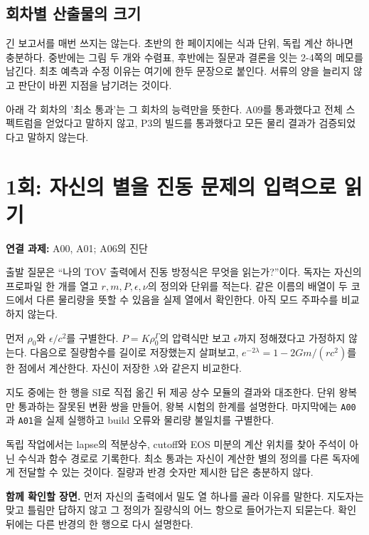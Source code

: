 \documentclass[
  10pt,
  a4paper,
]{article}
\begin{document}
\subsection{회차별 산출물의
크기}\label{uxd68cuxcc28uxbcc4-uxc0b0uxcd9cuxbb3cuxc758-uxd06cuxae30}

긴 보고서를 매번 쓰지는 않는다. 초반의 한 페이지에는 식과 단위, 독립
계산 하나면 충분하다. 중반에는 그림 두 개와 수렴표, 후반에는 질문과
결론을 잇는 2-4쪽의 메모를 남긴다. 최초 예측과 수정 이유는 여기에 한두
문장으로 붙인다. 서류의 양을 늘리지 않고 판단이 바뀐 지점을 남기려는
것이다.

아래 각 회차의 '최소 통과'는 그 회차의 능력만을 뜻한다. A09를 통과했다고
전체 스펙트럼을 얻었다고 말하지 않고, P3의 빌드를 통과했다고 모든 물리
결과가 검증되었다고 말하지 않는다.

\section{1회: 자신의 별을 진동 문제의 입력으로
읽기}\label{uxd68c-uxc790uxc2e0uxc758-uxbcc4uxc744-uxc9c4uxb3d9-uxbb38uxc81cuxc758-uxc785uxb825uxc73cuxb85c-uxc77duxae30}

\textbf{연결 과제:} A00, A01; A06의 진단

출발 질문은 ``나의 TOV 출력에서 진동 방정식은 무엇을 읽는가?''이다.
독자는 자신의 프로파일 한 개를 열고 \(r,m,P,\epsilon,\nu\)의 정의와
단위를 적는다. 같은 이름의 배열이 두 코드에서 다른 물리량을 뜻할 수
있음을 실제 열에서 확인한다. 아직 모드 주파수를 비교하지 않는다.

먼저 \(\rho_0\)와 \(\epsilon/c^2\)를 구별한다. \(P=K\rho_0^\Gamma\)의
압력식만 보고 \(\epsilon\)까지 정해졌다고 가정하지 않는다. 다음으로
질량함수를 길이로 저장했는지 살펴보고, \(e^{-2\lambda}=1-2Gm/(rc^2)\)를
한 점에서 계산한다. 자신이 저장한 \(\lambda\)와 같은지 비교한다.

지도 중에는 한 행을 SI로 직접 옮긴 뒤 제공 상수 모듈의 결과와 대조한다.
단위 왕복만 통과하는 잘못된 변환 쌍을 만들어, 왕복 시험의 한계를
설명한다. 마지막에는 \texttt{A00}과 \texttt{A01}을 실제 실행하고 build
오류와 물리량 불일치를 구별한다.

독립 작업에서는 lapse의 적분상수, cutoff와 EOS 미분의 계산 위치를 찾아
주석이 아닌 수식과 함수 경로로 기록한다. 최소 통과는 자신이 계산한 별의
정의를 다른 독자에게 전달할 수 있는 것이다. 질량과 반경 숫자만 제시한
답은 충분하지 않다.

\textbf{함께 확인할 장면.} 먼저 자신의 출력에서 밀도 열 하나를 골라
이유를 말한다. 지도자는 맞고 틀림만 답하지 않고 그 정의가 질량식의 어느
항으로 들어가는지 되묻는다. 확인 뒤에는 다른 반경의 한 행으로 다시
설명한다.
\end{document}
